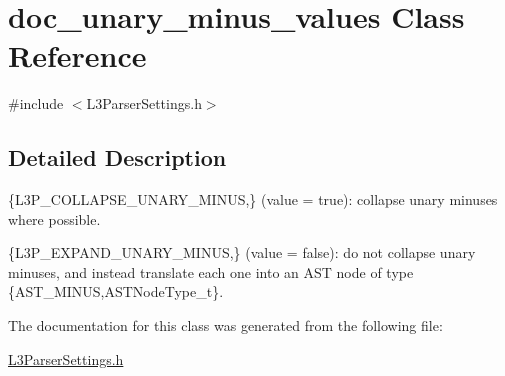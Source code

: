 \hypertarget{classdoc__unary__minus__values}{}\section{doc\+\_\+unary\+\_\+minus\+\_\+values Class Reference}
\label{classdoc__unary__minus__values}


{\ttfamily \#include $<$L3\+Parser\+Settings.\+h$>$}



\subsection{Detailed Description}

\begin{DoxyItemize}
\item \{L3\+P\+\_\+\+C\+O\+L\+L\+A\+P\+S\+E\+\_\+\+U\+N\+A\+R\+Y\+\_\+\+M\+I\+N\+US,\} (value = {\ttfamily true})\+: collapse unary minuses where possible. 
\item \{L3\+P\+\_\+\+E\+X\+P\+A\+N\+D\+\_\+\+U\+N\+A\+R\+Y\+\_\+\+M\+I\+N\+US,\} (value = {\ttfamily false})\+: do not collapse unary minuses, and instead translate each one into an A\+ST node of type \{A\+S\+T\+\_\+\+M\+I\+N\+US,A\+S\+T\+Node\+Type\+\_\+t\}. 
\end{DoxyItemize}

The documentation for this class was generated from the following file\+:\begin{DoxyCompactItemize}
\item 
\hyperlink{_l3_parser_settings_8h}{L3\+Parser\+Settings.\+h}\end{DoxyCompactItemize}
